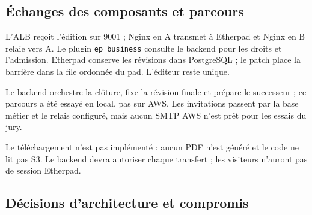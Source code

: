 \subsection{Échanges des composants et parcours}

L'ALB reçoit l'édition sur 9001 ; Nginx en A transmet à Etherpad et Nginx en B relaie vers A. Le plugin \texttt{ep\_business} consulte le backend pour les droits et l'admission. Etherpad conserve les révisions dans PostgreSQL ; le patch place la barrière dans la file ordonnée du pad. L'éditeur reste unique.

Le backend orchestre la clôture, fixe la révision finale et prépare le successeur ; ce parcours a été essayé en local, pas sur AWS. Les invitations passent par la base métier et le relais configuré, mais aucun SMTP AWS n'est prêt pour les essais du jury.

Le téléchargement n'est pas implémenté : aucun PDF n'est généré et le code ne lit pas S3. Le backend devra autoriser chaque transfert ; les visiteurs n'auront pas de session Etherpad.

\subsection{Décisions d'architecture et compromis}

